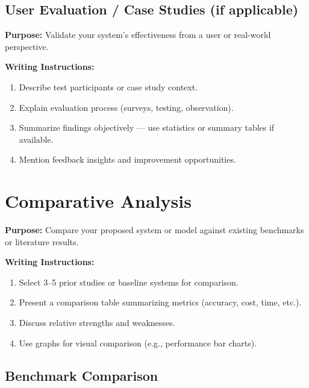 \subsection{User Evaluation / Case Studies (if applicable)}

{\color{blue}\textbf{Purpose:}
Validate your system’s effectiveness from a user or real-world perspective.} \\

{\color{red}\textbf{Writing Instructions:}
\begin{enumerate}
    \item Describe test participants or case study context.
    
    \item Explain evaluation process (surveys, testing, observation).
    
    \item Summarize findings objectively — use statistics or summary tables if available.
    
    \item Mention feedback insights and improvement opportunities.
\end{enumerate}}



\section{Comparative Analysis}

{\color{blue}\textbf{Purpose:}
Compare your proposed system or model against existing benchmarks or literature results.} \\

{\color{red}\textbf{Writing Instructions:}
\begin{enumerate}
    \item Select 3–5 prior studies or baseline systems for comparison.
    
    \item Present a comparison table summarizing metrics (accuracy, cost, time, etc.).
    
    \item Discuss relative strengths and weaknesses.
    
    \item Use graphs for visual comparison (e.g., performance bar charts).
\end{enumerate}}



\subsection{Benchmark Comparison}

